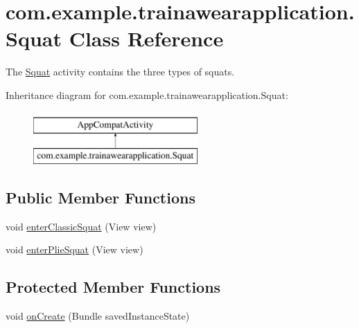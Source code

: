 \hypertarget{classcom_1_1example_1_1trainawearapplication_1_1_squat}{}\section{com.\+example.\+trainawearapplication.\+Squat Class Reference}
\label{classcom_1_1example_1_1trainawearapplication_1_1_squat}


The \mbox{\hyperlink{classcom_1_1example_1_1trainawearapplication_1_1_squat}{Squat}} activity contains the three types of squats.  


Inheritance diagram for com.\+example.\+trainawearapplication.\+Squat\+:\begin{figure}[H]
\begin{center}
\leavevmode
\includegraphics[height=2.000000cm]{classcom_1_1example_1_1trainawearapplication_1_1_squat}
\end{center}
\end{figure}
\subsection*{Public Member Functions}
\begin{DoxyCompactItemize}
\item 
void \mbox{\hyperlink{classcom_1_1example_1_1trainawearapplication_1_1_squat_aefefdea9b19687975d42841285ae8529}{enter\+Classic\+Squat}} (View view)
\item 
void \mbox{\hyperlink{classcom_1_1example_1_1trainawearapplication_1_1_squat_aa6869623862d4279d1a47e89b34cafb4}{enter\+Plie\+Squat}} (View view)
\end{DoxyCompactItemize}
\subsection*{Protected Member Functions}
\begin{DoxyCompactItemize}
\item 
void \mbox{\hyperlink{classcom_1_1example_1_1trainawearapplication_1_1_squat_a2ee401e1a295432f8196e77dcca9df5f}{on\+Create}} (Bundle saved\+Instance\+State)
\end{DoxyCompactItemize}


